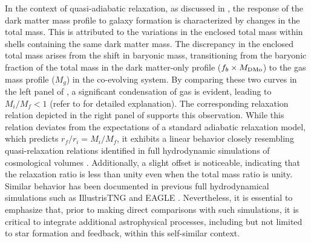 In the context of quasi-adiabatic relaxation, as discussed in , the response of the dark matter mass profile to galaxy formation is characterized by changes in the total mass. This is attributed to the variations in the enclosed total mass within shells containing the same dark matter mass. The discrepancy in the enclosed total mass arises from the shift in baryonic mass, transitioning from the baryonic fraction of the total mass in the dark matter-only profile ($f_b \times M_{\rm DMo}$) to the gas mass profile ($M_g$) in the co-evolving system. By comparing these two curves in the left panel of , a significant condensation of gas is evident, leading to $M_i/M_f < 1$ (refer to  for detailed explanation). The corresponding relaxation relation depicted in the right panel of  supports this observation. While this relation deviates from the expectations of a standard adiabatic relaxation model, which predicts $r_f/r_i = M_i/M_f$, it exhibits a linear behavior closely resembling quasi-relaxation relations identified in full hydrodynamic simulations of cosmological volumes \cite{2023Velmani&Paranjape}. Additionally, a slight offset is noticeable, indicating that the relaxation ratio is less than unity even when the total mass ratio is unity. Similar behavior has been documented in previous full hydrodynamical simulations such as IllustrisTNG and EAGLE \cite{2023Velmani&Paranjape}. Nevertheless, it is essential to emphasize that, prior to making direct comparisons with such simulations, it is critical to integrate additional astrophysical processes, including but not limited to star formation and feedback, within this self-similar context.

